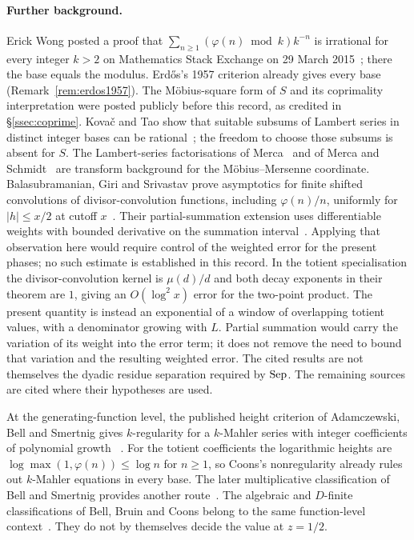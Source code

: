 \documentclass[11pt]{article}
\theoremstyle{plain}
\theoremstyle{definition}
\theoremstyle{remark}
\let\origmathrm\mathrm
\renewcommand{\mathrm}[1]{\ifmmode\origmathrm{#1}\else\textrm{#1}\fi}%
\newcommand{\ph}{\varphi}
\begin{document}
\paragraph{Further background.}
Erick Wong posted a proof that
$\sum_{n\ge1}(\varphi(n)\bmod k)k^{-n}$ is irrational for every integer $k>2$
on Mathematics Stack Exchange on 29 March 2015~\cite{wong2015}; there the base
equals the modulus. Erd\H{o}s's 1957 criterion already gives every base
(Remark~\ref{rem:erdos1957}).  The M\"obius-square form of $S$ and its coprimality
interpretation were posted publicly before this record, as credited in
\S\ref{ssec:coprime}.  Kova\v{c} and Tao show that suitable subsums of Lambert
series in distinct integer bases can be rational~\cite[Theorem~2.3]{kovac-tao};
the freedom to choose those subsums is absent for $S$.  The Lambert-series
factorisations of Merca~\cite[Theorem~1.2]{merca2017} and of Merca and
Schmidt~\cite{merca-schmidt} are transform background for the
M\"obius--Mersenne coordinate.  Balasubramanian, Giri and Srivastav prove
asymptotics for finite shifted convolutions of divisor-convolution
functions, including $\varphi(n)/n$, uniformly for $|h|\le x/2$ at
cutoff $x$~\cite[Theorem~2.2]{bgs2016}. Their partial-summation extension
uses differentiable weights with bounded derivative on the summation
interval~\cite[Rem.~2.9]{bgs2016}.
Applying that observation here would require control of the weighted
error for the present phases; no such estimate is established in this
record.
In the totient specialisation the divisor-convolution kernel is
$\mu(d)/d$ and both decay exponents in their theorem are $1$, giving
an $O(\log^2x)$ error for the two-point product. The present quantity
is instead an exponential of a window of overlapping totient values,
with a denominator growing with $L$. Partial summation would carry
the variation of its weight into the error term; it does not remove
the need to bound that variation and the resulting weighted error. The cited results are not themselves the dyadic residue
separation required by $\mathrm{Sep}$.  The remaining sources are cited where their hypotheses are
used.

At the generating-function level, the published height criterion of
Adamczewski, Bell and Smertnig gives $k$-regularity for a $k$-Mahler
series with integer coefficients of polynomial growth
~\cite[Thm.~1.2(b), p.~2528]{adamczewski-bell-smertnig2023}.
For the totient coefficients the logarithmic heights are
$\log\max(1,\ph(n))\le\log n$ for $n\ge1$, so Coons's nonregularity
already rules out $k$-Mahler equations in every base. The later
multiplicative classification of Bell and Smertnig provides another
route~\cite[Thm.~1.3 and p.~3]{bell-smertnig2026}.
The algebraic and $D$-finite classifications of Bell, Bruin and Coons
belong to the same function-level context~\cite[Thms.~1.5--1.6]{bell-bruin-coons}.
They do not by themselves decide the value at $z=1/2$.
\end{document}
